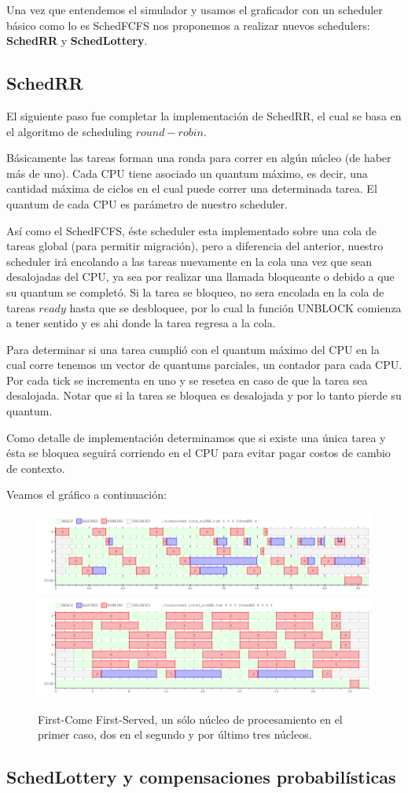 Una vez que entendemos el simulador y usamos el graficador con un scheduler básico como lo es SchedFCFS nos proponemos a realizar nuevos schedulers: \textbf{SchedRR} y \textbf{SchedLottery}.

\subsection{SchedRR}

El siguiente paso fue completar la implementación de SchedRR, el cual se basa en el algoritmo de scheduling $round-robin$. 

Básicamente las tareas forman una ronda para correr en algún núcleo (de haber más de uno). Cada CPU tiene asociado un quantum máximo, es decir, una cantidad máxima de ciclos en el cual puede correr una determinada tarea. El quantum de cada CPU es parámetro de nuestro scheduler.

Así como el SchedFCFS, éste scheduler esta implementado sobre una cola de tareas global (para permitir migración), pero a diferencia del anterior, nuestro scheduler irá encolando a las tareas nuevamente en la cola una vez que sean desalojadas del CPU, ya sea por realizar una llamada bloqueante o debido a que su quantum se completó. Si la tarea se bloqueo, no sera encolada en la cola de tareas $ready$ hasta que se desbloquee, por lo cual la función UNBLOCK comienza a tener sentido y es ahi donde la tarea regresa a la cola.

Para determinar si una tarea cumplió con el quantum máximo del CPU en la cual corre tenemos un vector de quantums parciales, un contador para cada CPU. Por cada tick se incrementa en uno y se resetea en caso de que la tarea sea desalojada. Notar que si la tarea se bloquea es desalojada y por lo tanto pierde su quantum.

Como detalle de implementación determinamos que si existe una única tarea y ésta se bloquea seguirá corriendo en el CPU para evitar pagar costos de cambio de contexto.

Veamos el gráfico a continuación:

\begin{figure}[H]
\centering\includegraphics[width=18 cm]{graficos/ej4RR1.png}
\centering\includegraphics[width=18 cm]{graficos/ej4RR2.png}
\caption{First-Come First-Served, un sólo núcleo de procesamiento en el primer caso, dos en el segundo y por último tres núcleos.}
\end{figure}



\subsection{SchedLottery y compensaciones probabilísticas}



